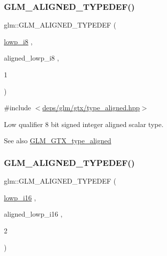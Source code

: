 \subsubsection{\texorpdfstring{G\+L\+M\+\_\+\+A\+L\+I\+G\+N\+E\+D\+\_\+\+T\+Y\+P\+E\+D\+E\+F()}{GLM\_ALIGNED\_TYPEDEF()}\hspace{0.1cm}{\footnotesize\ttfamily [9/209]}}
{\footnotesize\ttfamily glm\+::\+G\+L\+M\+\_\+\+A\+L\+I\+G\+N\+E\+D\+\_\+\+T\+Y\+P\+E\+D\+EF (\begin{DoxyParamCaption}\item[{\hyperlink{group__gtc__type__precision_gaa2e13ee29c90f75658beed6082541097}{lowp\+\_\+i8}}]{,  }\item[{aligned\+\_\+lowp\+\_\+i8}]{,  }\item[{1}]{ }\end{DoxyParamCaption})}



{\ttfamily \#include $<$\hyperlink{gtx_2type__aligned_8hpp}{deps/glm/gtx/type\+\_\+aligned.\+hpp}$>$}

Low qualifier 8 bit signed integer aligned scalar type. \begin{DoxySeeAlso}{See also}
\hyperlink{group__gtx__type__aligned}{G\+L\+M\+\_\+\+G\+T\+X\+\_\+type\+\_\+aligned} 
\end{DoxySeeAlso}
\mbox{\label{group__gtx__type__aligned_ga50257b48069a31d0c8d9c1f644d267de}} 
\subsubsection{\texorpdfstring{G\+L\+M\+\_\+\+A\+L\+I\+G\+N\+E\+D\+\_\+\+T\+Y\+P\+E\+D\+E\+F()}{GLM\_ALIGNED\_TYPEDEF()}\hspace{0.1cm}{\footnotesize\ttfamily [10/209]}}
{\footnotesize\ttfamily glm\+::\+G\+L\+M\+\_\+\+A\+L\+I\+G\+N\+E\+D\+\_\+\+T\+Y\+P\+E\+D\+EF (\begin{DoxyParamCaption}\item[{\hyperlink{group__gtc__type__precision_gaf7bbfd31bcec25a416ea94d09efb5451}{lowp\+\_\+i16}}]{,  }\item[{aligned\+\_\+lowp\+\_\+i16}]{,  }\item[{2}]{ }\end{DoxyParamCaption})}



